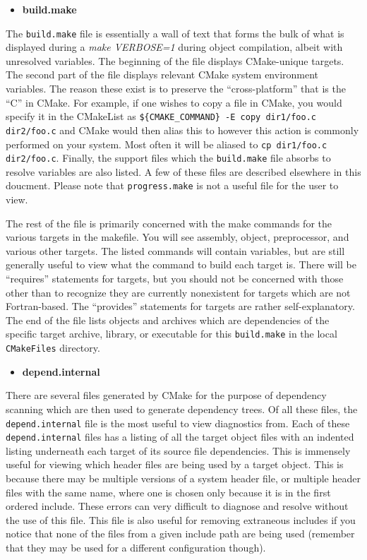 \documentclass[12pt,letterpaper]{article}
\begin{document}
\begin{itemize}
\item \textbf{build.make}
\end{itemize}

The \verb|build.make| file is essentially a wall of text that forms the bulk of what is displayed during a \emph{make VERBOSE=1} during object compilation, albeit with unresolved variables.  The beginning of the file displays CMake-unique targets.  The second part of the file displays relevant CMake system environment variables.  The reason these exist is to preserve the ``cross-platform'' that is the ``C'' in CMake.  For example, if one wishes to copy a file in CMake, you would specify it in the CMakeList as \linebreak\verb|${CMAKE_COMMAND} -E copy dir1/foo.c dir2/foo.c| and CMake would then alias this to however this action is commonly performed on your system.  Most often it will be aliased to \verb|cp dir1/foo.c dir2/foo.c|.  Finally, the support files which the \verb|build.make| file absorbs to resolve variables are also listed.  A few of these files are described elsewhere in this doucment.  Please note that \verb|progress.make| is not a useful file for the user to view.

The rest of the file is primarily concerned with the make commands for the various targets in the makefile.  You will see assembly, object, preprocessor, and various other targets.  The listed commands will contain variables, but are still generally useful to view what the command to build each target is.  There will be ``requires'' statements for targets, but you should not be concerned with those other than to recognize they are currently nonexistent for targets which are not Fortran-based.  The ``provides'' statements for targets are rather self-explanatory.  The end of the file lists objects and archives which are dependencies of the specific target archive, library, or executable for this \verb|build.make| in the local \verb|CMakeFiles| directory.

\begin{itemize}
\item \textbf{depend.internal}
\end{itemize}

There are several files generated by CMake for the purpose of dependency scanning which are then used to generate dependency trees.  Of all these files, the \verb|depend.internal| file is the most useful to view diagnostics from.  Each of these \verb|depend.internal| files has a listing of all the target object files with an indented listing underneath each target of its source file dependencies.  This is immensely useful for viewing which header files are being used by a target object.  This is because there may be multiple versions of a system header file, or multiple header files with the same name, where one is chosen only because it is in the first ordered include.  These errors can very difficult to diagnose and resolve without the use of this file.  This file is also useful for removing extraneous includes if you notice that none of the files from a given include path are being used (remember that they may be used for a different configuration though).
\end{document}
